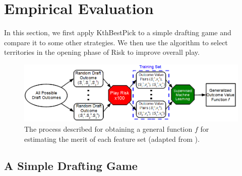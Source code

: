 \documentclass[letterpaper]{article}
\newtheorem{theorem1}{Theorem}
\numberwithin{equation}{section}
\numberwithin{theorem}{section}
\numberwithin{lemma}{section}
\numberwithin{df}{section}
\begin{document}

%

\section{Empirical Evaluation}

In this section, we first apply KthBestPick to a simple drafting game and compare it to some other strategies.  We then use the algorithm to select territories in the opening phase of Risk to improve overall play.

\begin{figure}[t]
	\centering
	\includegraphics[scale=0.5]{figs/MachineLearner.png}
	\caption{The process described for obtaining a general function $f$ for estimating the merit of each feature set (adapted from \cite[Figure 5.1]{GregLeeThesis}).}
	\label{fig:MachLearn}
\end{figure}

\subsection{A Simple Drafting Game}
\end{document}
